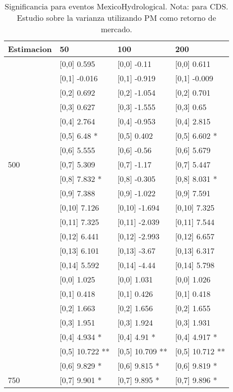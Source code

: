 \begin{table}

\caption{Significancia para eventos MexicoHydrological. Nota: para CDS. Estudio sobre la varianza utilizando PM como retorno de mercado.}
\centering
\begin{tabular}[t]{llll}
\toprule
Estimacion & 50 & 100 & 200\\
\midrule
 & {}[0,0] 0.595 & {}[0,0] -0.11 & {}[0,0] 0.611\\
 & {}[0,1] -0.016 & {}[0,1] -0.919 & {}[0,1] -0.009\\
 & {}[0,2] 0.692 & {}[0,2] -1.054 & {}[0,2] 0.701\\
 & {}[0,3] 0.627 & {}[0,3] -1.555 & {}[0,3] 0.65\\
 & {}[0,4] 2.764 & {}[0,4] -0.953 & {}[0,4] 2.815\\
\addlinespace
 & {}[0,5] 6.48 * & {}[0,5] 0.402 & {}[0,5] 6.602 *\\
 & {}[0,6] 5.555 & {}[0,6] -0.56 & {}[0,6] 5.679\\
500 & {}[0,7] 5.309 & {}[0,7] -1.17 & {}[0,7] 5.447\\
 & {}[0,8] 7.832 * & {}[0,8] -0.305 & {}[0,8] 8.031 *\\
 & {}[0,9] 7.388 & {}[0,9] -1.022 & {}[0,9] 7.591\\
\addlinespace
 & {}[0,10] 7.126 & {}[0,10] -1.694 & {}[0,10] 7.325\\
 & {}[0,11] 7.325 & {}[0,11] -2.039 & {}[0,11] 7.544\\
 & {}[0,12] 6.441 & {}[0,12] -2.993 & {}[0,12] 6.657\\
 & {}[0,13] 6.101 & {}[0,13] -3.67 & {}[0,13] 6.317\\
 & {}[0,14] 5.592 & {}[0,14] -4.44 & {}[0,14] 5.798\\
\addlinespace
 & {}[0,0] 1.025 & {}[0,0] 1.031 & {}[0,0] 1.026\\
 & {}[0,1] 0.418 & {}[0,1] 0.426 & {}[0,1] 0.418\\
 & {}[0,2] 1.663 & {}[0,2] 1.656 & {}[0,2] 1.655\\
 & {}[0,3] 1.951 & {}[0,3] 1.924 & {}[0,3] 1.931\\
 & {}[0,4] 4.934 * & {}[0,4] 4.91 * & {}[0,4] 4.917 *\\
\addlinespace
 & {}[0,5] 10.722 ** & {}[0,5] 10.709 ** & {}[0,5] 10.712 **\\
 & {}[0,6] 9.829 * & {}[0,6] 9.815 * & {}[0,6] 9.819 *\\
750 & {}[0,7] 9.901 * & {}[0,7] 9.895 * & {}[0,7] 9.896 *\\

\end{tabular}
\end{table}
